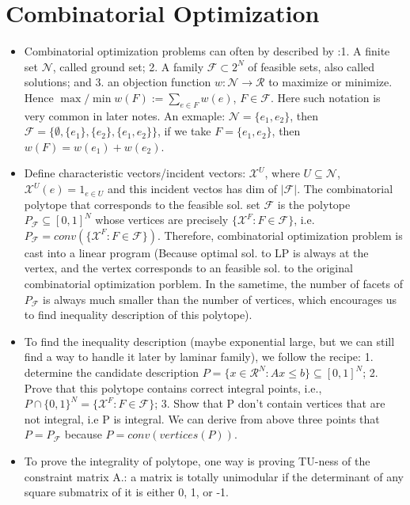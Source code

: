 \documentclass{article}
\begin{document}
\section{Combinatorial Optimization}
\begin{itemize}
\item Combinatorial optimization problems can often by described by :1. A finite set $\mathcal{N}$, called ground set; 2. A family $\mathcal{F}\subset 2^{N}$ of feasible sets, also called solutions; and 3. an objection function $w: \mathcal{N}\rightarrow \mathcal{R}$ to maximize or minimize. Hence $\max/\min w(F):=\underset{e\in F}{\sum}w(e)$, $F\in\mathcal{F}$. Here such notation is very common in later notes. An exmaple: $\mathcal{N}=\{e_1,e_2\}$, then $\mathcal{F}=\{\emptyset,\{e_1\},\{e_2\},\{e_1,e_2\}\}$, if we take $F=\{e_1,e_2\}$, then $w(F)=w(e_1)+w(e_2)$.
\item Define characteristic vectors/incident vectors: $\mathcal{X}^U$, where $U\subseteq \mathcal{N}$, $\mathcal{X}^U(e)=1_{e\in U}$ and this incident vectos has dim of $|\mathcal{F}|$. The combinatorial polytope that corresponds to the feasible sol. set $\mathcal{F}$ is the polytope $P_{\mathcal{F}}\subseteq [0,1]^N$ whose vertices are precisely $\{\mathcal{X}^F:F\in \mathcal{F}\}$, i.e. $P_{\mathcal{F}}=conv(\{\mathcal{X}^F: F\in\mathcal{F}\})$. Therefore, combinatorial optimization problem is cast into a linear program (Because optimal sol. to LP is always at the vertex, and the vertex corresponds to an feasible sol. to the original combinatorial optimization porblem. In the sametime, the number of facets of $P_{\mathcal{F}}$ is always much smaller than the number of vertices, which encourages us to find inequality description of this polytope).
\item To find the inequality description (maybe exponential large, but we can still find a way to handle it later by laminar family), we follow the recipe: 1. determine the candidate description $P=\{x\in\mathcal{R}^N:Ax\leq b\}\subseteq [0,1]^N$; 2. Prove that this polytope contains correct integral points, i.e., $P\cap\{0,1\}^N=\{\mathcal{X}^F:F\in\mathcal{F}\}$; 3. Show that P don't contain vertices that are not integral, i.e P is integral. We can derive from above three points that $P=P_{\mathcal{F}}$ because $P=conv(vertices(P))$.
\item To prove the integrality of polytope, one way is proving TU-ness of the constraint matrix A.: a matrix is totally unimodular if the determinant of any square submatrix of it is either 0, 1, or -1.
\begin{itemize}

\end{itemize}
\end{itemize}
\end{document}
